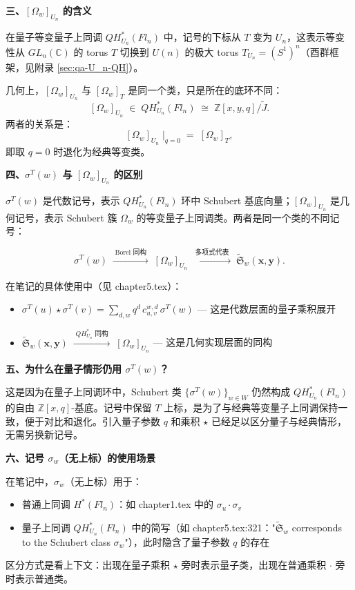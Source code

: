 \textbf{三、$[\Omega_w]_{U_n}$ 的含义}

在量子等变量子上同调 $QH_{U_n}^*(Fl_n)$ 中，记号的下标从 $T$ 变为 $U_n$，这表示等变性从 $GL_n(\mathbb{C})$ 的 torus $T$ 切换到 $U(n)$ 的极大 torus $T_{U_n} = (S^1)^n$（酉群框架，见附录 \cref{sec:qa-U_n-QH}）。

几何上，$[\Omega_w]_{U_n}$ 与 $[\Omega_w]_T$ 是同一个类，只是所在的底环不同：
$$[\Omega_w]_{U_n} \;\in\; QH_{U_n}^*(Fl_n) \;\cong\; \mathbb{Z}[x,y,q]/\widetilde{J}.$$
两者的关系是：
$$[\Omega_w]_{U_n} \;\big|_{q=0} \;=\; [\Omega_w]_T,$$
即取 $q=0$ 时退化为经典等变类。

\textbf{四、$\sigma^T(w)$ 与 $[\Omega_w]_{U_n}$ 的区别}

$\sigma^T(w)$ 是代数记号，表示 $QH_{U_n}^*(Fl_n)$ 环中 Schubert 基底向量；$[\Omega_w]_{U_n}$ 是几何记号，表示 Schubert 簇 $\Omega_w$ 的等变量子上同调类。两者是同一个类的不同记号：

$$\sigma^T(w) \;\xrightarrow{\;\text{Borel 同构}\;}\; [\Omega_w]_{U_n} \;\xrightarrow{\;\text{多项式代表}\;}\; \widetilde{\mathfrak{S}}_w(\mathbf{x},\mathbf{y}).$$

在笔记的具体使用中（见 chapter5.tex）：
\begin{itemize}
\item $\sigma^T(u) \star \sigma^T(v) = \sum_{d,w} q^d \, c_{u,v}^{w,d} \, \sigma^T(w)$ — 这是代数层面的量子乘积展开
\item $\widetilde{\mathfrak{S}}_w(\mathbf{x},\mathbf{y}) \;\xrightarrow{\;QH_{U_n}^*\text{ 同构}\;}\; [\Omega_w]_{U_n}$ — 这是几何实现层面的同构
\end{itemize}

\textbf{五、为什么在量子情形仍用 $\sigma^T(w)$？}

这是因为在量子上同调环中，Schubert 类 $\{\sigma^T(w)\}_{w \in W}$ 仍然构成 $QH_{U_n}^*(Fl_n)$ 的自由 $\mathbb{Z}[x,q]$-基底。记号中保留 $T$ 上标，是为了与经典等变量子上同调保持一致，便于对比和退化。引入量子参数 $q$ 和乘积 $\star$ 已经足以区分量子与经典情形，无需另换新记号。

\textbf{六、记号 $\sigma_w$（无上标）的使用场景}

在笔记中，$\sigma_w$（无上标）用于：
\begin{itemize}
\item 普通上同调 $H^*(Fl_n)$：如 chapter1.tex 中的 $\sigma_u \cdot \sigma_v$
\item 量子上同调 $QH_{U_n}^*(Fl_n)$ 中的简写（如 chapter5.tex:321："$\widetilde{\mathfrak{S}}_w$ corresponds to the Schubert class $\sigma_w$"），此时隐含了量子参数 $q$ 的存在
\end{itemize}
区分方式是看上下文：出现在量子乘积 $\star$ 旁时表示量子类，出现在普通乘积 $\cdot$ 旁时表示普通类。
